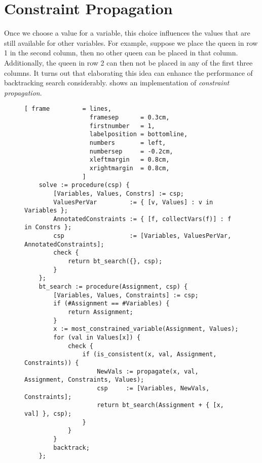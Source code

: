 \section{Constraint Propagation}
Once we choose a value for a variable, this choice influences the values that are still available for other variables.
For example, suppose we place the queen in row 1 in the second column, then no other queen can be placed in
that column.   Additionally, the queen in row 2 can then not be placed in any of the first three columns.
It turns out that elaborating this idea can enhance the performance of backtracking search considerably.
 shows an implementation of \emph{\color{blue}constraint propagation}.

\begin{figure}[!ht]
\centering
\begin{Verbatim}[ frame         = lines, 
                  framesep      = 0.3cm, 
                  firstnumber   = 1,
                  labelposition = bottomline,
                  numbers       = left,
                  numbersep     = -0.2cm,
                  xleftmargin   = 0.8cm,
                  xrightmargin  = 0.8cm,
                ]
    solve := procedure(csp) {
        [Variables, Values, Constrs] := csp;
        ValuesPerVar         := { [v, Values] : v in Variables };
        AnnotatedConstraints := { [f, collectVars(f)] : f in Constrs };
        csp                  := [Variables, ValuesPerVar, AnnotatedConstraints];
        check {
            return bt_search({}, csp);
        }
    };
    bt_search := procedure(Assignment, csp) {
        [Variables, Values, Constraints] := csp;
        if (#Assignment == #Variables) {
            return Assignment;
        }
        x := most_constrained_variable(Assignment, Values);
        for (val in Values[x]) {
            check {
                if (is_consistent(x, val, Assignment, Constraints)) {
                    NewVals := propagate(x, val, Assignment, Constraints, Values);
                    csp     := [Variables, NewVals, Constraints];
                    return bt_search(Assignment + { [x, val] }, csp);
                }
            }
        }
        backtrack;
    };
\end{Verbatim}
\vspace*{-0.3cm}
\caption{}
\label{fig:csp-constraint-propagation.stlx-1}
\end{figure}

